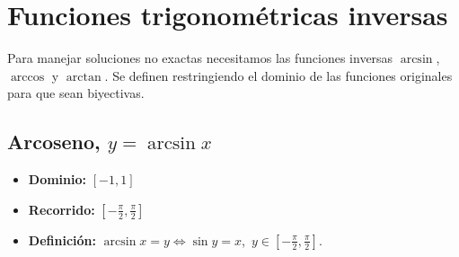 \documentclass[12pt,a4paper]{article}
\begin{document}
\section{Funciones trigonométricas inversas}
Para manejar soluciones no exactas necesitamos las funciones inversas $\arcsin$, $\arccos$ y $\arctan$. Se definen restringiendo el dominio de las funciones originales para que sean biyectivas.

\subsection{Arcoseno, $y = \arcsin x$}
\begin{minipage}{0.45\textwidth}
    \begin{itemize}
        \item \textbf{Dominio:} $[-1,1]$
        \item \textbf{Recorrido:} $\left[-\frac{\pi}{2},\frac{\pi}{2}\right]$
        \item \textbf{Definición:} $\arcsin x = y \iff \sin y = x$,\, $y\in\left[-\frac{\pi}{2},\frac{\pi}{2}\right]$.
    \end{itemize}
\end{minipage}\hfill
\begin{minipage}{0.5\textwidth}
    \centering
\end{minipage}
\end{document}
